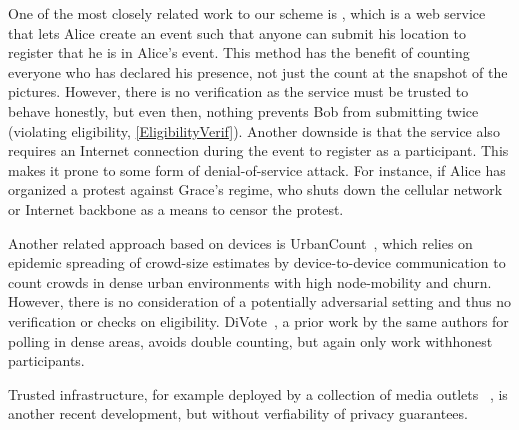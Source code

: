 One of the most closely related work to our scheme is \citet{CrowdCount}, which is a web service that lets Alice create an event such that anyone can submit his location to register that he is in Alice's event.
This method has the benefit of counting everyone who has declared his presence, not just the count at the snapshot of the pictures.
However, there is no verification as the service must be trusted to behave honestly, but even then, nothing prevents Bob from submitting twice (violating eligibility, \cref{EligibilityVerif}).
Another downside is that the service also requires an Internet connection during the event to register as a participant.
This makes it prone to some form of denial-of-service attack.
For instance, if Alice has organized a protest against Grace's regime, who shuts down the cellular network or Internet backbone as a means to censor the protest.

Another related approach based on devices is UrbanCount~\cite{UrbanCount}, which relies on epidemic spreading of crowd-size estimates by device-to-device communication to count crowds in dense urban environments with high node-mobility and churn.
However, there is no consideration of a potentially adversarial setting and thus no verification or checks on eligibility.  DiVote~\cite{DiVote}, a prior work by the same authors for polling in dense areas, avoids double counting, but again only work withhonest participants.

Trusted infrastructure, for example deployed by a collection of  media outlets ~\cite{LeMondeProtestingSolution}, is another recent development, but without verfiability of privacy guarantees.


